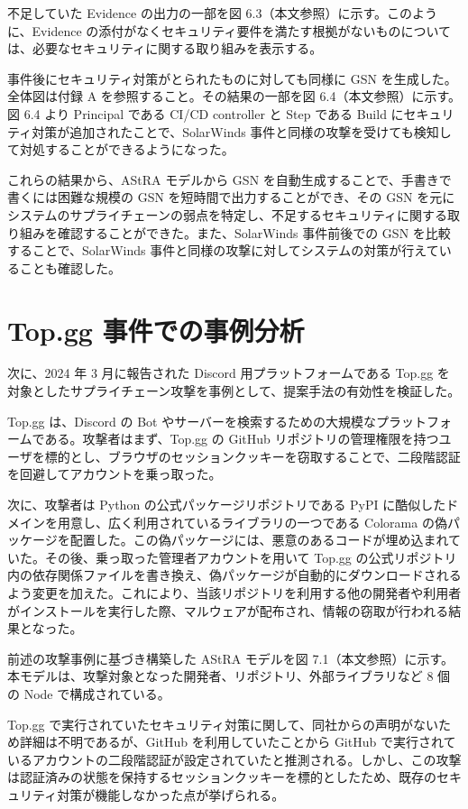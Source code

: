 \documentclass[paper]{ieicej} %
\begin{document}
不足していた Evidence の出力の一部を図 6.3（本文参照）に示す。このように、Evidence の添付がなくセキュリティ要件を満たす根拠がないものについては、必要なセキュリティに関する取り組みを表示する。

事件後にセキュリティ対策がとられたものに対しても同様に GSN を生成した。全体図は付録 A を参照すること。その結果の一部を図 6.4（本文参照）に示す。図 6.4 より Principal である CI/CD controller と Step である Build にセキュリティ対策が追加されたことで、SolarWinds 事件と同様の攻撃を受けても検知して対処することができるようになった。

これらの結果から、AStRA モデルから GSN を自動生成することで、手書きで書くには困難な規模の GSN を短時間で出力することができ、その GSN を元にシステムのサプライチェーンの弱点を特定し、不足するセキュリティに関する取り組みを確認することができた。また、SolarWinds 事件前後での GSN を比較することで、SolarWinds 事件と同様の攻撃に対してシステムの対策が行えていることも確認した。

\section{Top.gg 事件での事例分析}
次に、2024 年 3 月に報告された Discord 用プラットフォームである Top.gg を対象としたサプライチェーン攻撃を事例として、提案手法の有効性を検証した。

Top.gg は、Discord の Bot やサーバーを検索するための大規模なプラットフォームである。攻撃者はまず、Top.gg の GitHub リポジトリの管理権限を持つユーザを標的とし、ブラウザのセッションクッキーを窃取することで、二段階認証を回避してアカウントを乗っ取った。

次に、攻撃者は Python の公式パッケージリポジトリである PyPI に酷似したドメインを用意し、広く利用されているライブラリの一つである Colorama の偽パッケージを配置した。この偽パッケージには、悪意のあるコードが埋め込まれていた。その後、乗っ取った管理者アカウントを用いて Top.gg の公式リポジトリ内の依存関係ファイルを書き換え、偽パッケージが自動的にダウンロードされるよう変更を加えた。これにより、当該リポジトリを利用する他の開発者や利用者がインストールを実行した際、マルウェアが配布され、情報の窃取が行われる結果となった。

前述の攻撃事例に基づき構築した AStRA モデルを図 7.1（本文参照）に示す。本モデルは、攻撃対象となった開発者、リポジトリ、外部ライブラリなど 8 個の Node で構成されている。

Top.gg で実行されていたセキュリティ対策に関して、同社からの声明がないため詳細は不明であるが、GitHub を利用していたことから GitHub で実行されているアカウントの二段階認証が設定されていたと推測される。しかし、この攻撃は認証済みの状態を保持するセッションクッキーを標的としたため、既存のセキュリティ対策が機能しなかった点が挙げられる。
\end{document}

